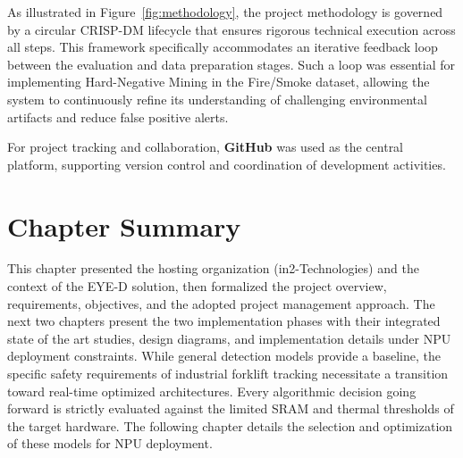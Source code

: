 As illustrated in Figure~\ref{fig:methodology}, the project methodology is governed by a circular CRISP-DM lifecycle that ensures rigorous technical execution across all steps. This framework specifically accommodates an iterative feedback loop between the evaluation and data preparation stages. Such a loop was essential for implementing Hard-Negative Mining in the Fire/Smoke dataset, allowing the system to continuously refine its understanding of challenging environmental artifacts and reduce false positive alerts.

For project tracking and collaboration, \textbf{GitHub} was used as the central platform, supporting version control and coordination of development activities.

\section{Chapter Summary}
This chapter presented the hosting organization (in2-Technologies) and the context of the EYE-D solution, then formalized the project overview, requirements, objectives, and the adopted project management approach. The next two chapters present the two implementation phases with their integrated state of the art studies, design diagrams, and implementation details under NPU deployment constraints. While general detection models provide a baseline, the specific safety requirements of industrial forklift tracking necessitate a transition toward real-time optimized architectures. Every algorithmic decision going forward is strictly evaluated against the limited SRAM and thermal thresholds of the target hardware. The following chapter details the selection and optimization of these models for NPU deployment.





